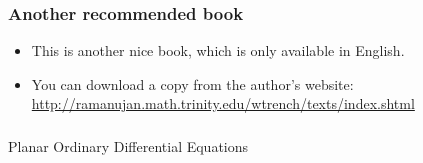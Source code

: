 \documentclass[9pt]{beamer}
\begin{document}
\begin{frame}[t]
 \frametitle{Another recommended book}
 
 \begin{center}
 \end{center}

 \begin{itemize}
  \item<1-> This is another nice book, which is only available in English.
  \item<2-> You can download a copy from the author's website:
   \url{http://ramanujan.math.trinity.edu/wtrench/texts/index.shtml}
 \end{itemize}
\end{frame}

\begin{frame}[t]
\frametitle{}
 {\Huge
  \vspace{6ex}
  \begin{center}
   Planar Ordinary Differential Equations
  \end{center}
 }
\end{frame}
\end{document}
